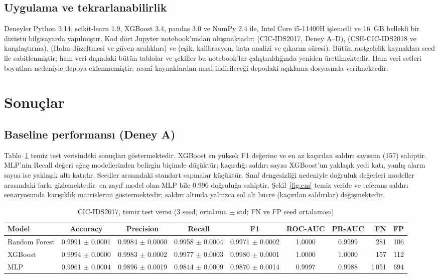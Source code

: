 \documentclass[conference]{IEEEtran}
\begin{document}
\subsection{Uygulama ve tekrarlanabilirlik}
Deneyler Python 3.14, scikit-learn 1.9, XGBoost 3.4, pandas 3.0 ve NumPy 2.4 ile, Intel Core i5-11400H işlemcili ve 16~GB bellekli bir dizüstü bilgisayarda yapılmıştır. Kod dört Jupyter notebook'undan oluşmaktadır:  (CIC-IDS2017, Deney A--D),  (CSE-CIC-IDS2018 ve karşılaştırma),  (Holm düzeltmesi ve güven aralıkları) ve  (eşik, kalibrasyon, hata analizi ve çıkarım süresi). Bütün rastgelelik kaynakları seed ile sabitlenmiştir; ham veri dışındaki bütün tablolar ve şekiller bu notebook'lar çalıştırıldığında yeniden üretilmektedir. Ham veri setleri boyutları nedeniyle depoya eklenmemiştir; resmî kaynaklardan nasıl indirileceği depodaki açıklama dosyasında verilmektedir.

\section{Sonuçlar}

\subsection{Baseline performansı (Deney A)}
Tablo~\ref{tab:baseline} temiz test verisindeki sonuçları göstermektedir. XGBoost en yüksek F1 değerine ve en az kaçırılan saldırı sayısına (157) sahiptir. MLP'nin Recall değeri ağaç modellerinden belirgin biçimde düşüktür; kaçırdığı saldırı sayısı XGBoost'un yaklaşık yedi katı, yanlış alarm sayısı ise yaklaşık altı katıdır. Seedler arasındaki standart sapmalar küçüktür. Sınıf dengesizliği nedeniyle doğruluk değerleri modeller arasındaki farkı gizlemektedir: en zayıf model olan MLP bile 0.996 doğruluğa sahiptir. Şekil~\ref{fig:cm} temiz veride ve referans saldırı senaryosunda karışıklık matrislerini göstermektedir; saldırı altında yalnızca sol alt hücre (kaçırılan saldırılar) değişmektedir.

\begin{table}[t]
\caption{CIC-IDS2017, temiz test verisi (3 seed, ortalama $\pm$ std; FN ve FP seed ortalaması)}
\label{tab:baseline}
\centering
\small
\setlength{\tabcolsep}{4pt}
\begin{tabular}{lccccccrr}
\toprule
Model & Accuracy & Precision & Recall & F1 & ROC-AUC & PR-AUC & FN & FP \\
\midrule
Random Forest & 0.9991 $\pm$ 0.0001 & 0.9984 $\pm$ 0.0000 & 0.9958 $\pm$ 0.0004 & 0.9971 $\pm$ 0.0002 & 1.0000 & 0.9999 & 281 & 106 \\
XGBoost & 0.9994 $\pm$ 0.0000 & 0.9983 $\pm$ 0.0002 & 0.9977 $\pm$ 0.0003 & 0.9980 $\pm$ 0.0001 & 1.0000 & 1.0000 & 157 & 112 \\
MLP & 0.9961 $\pm$ 0.0004 & 0.9896 $\pm$ 0.0019 & 0.9844 $\pm$ 0.0009 & 0.9870 $\pm$ 0.0014 & 0.9997 & 0.9988 & 1\,051 & 694 \\
\bottomrule
\end{tabular}
\end{table}
\end{document}
